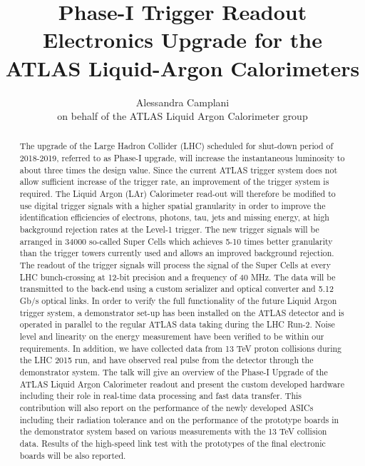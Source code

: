 \documentclass{llncs}
\title{Phase-I Trigger Readout Electronics Upgrade for the ATLAS Liquid-Argon Calorimeters}
\author{Alessandra Camplani\inst{1}\inst{2} \\ 
on behalf of the ATLAS Liquid Argon Calorimeter group}
\institute{Universt\'a degli Studi di Milano
\and INFN Milano \\
\email{alessandra.camplani@mi.infn.it}}
\begin{document}
\maketitle

\begin{abstract}
The upgrade of the Large Hadron Collider (LHC) scheduled for shut-down period of 2018-2019, referred to as Phase-I upgrade, will increase the instantaneous luminosity to about three times the design value. Since the current ATLAS trigger system does not allow sufficient increase of the trigger rate, an improvement of the trigger system is required. The Liquid Argon (LAr) Calorimeter read-out will therefore be modified to use digital trigger signals with a higher spatial granularity in order to improve the identification efficiencies of electrons, photons, tau, jets and missing energy, at high background rejection rates at the Level-1 trigger. The new trigger signals will be arranged in 34000 so-called Super Cells which achieves 5-10 times better granularity than the trigger towers currently used and allows an improved background rejection. The readout of the trigger signals will process the signal of the Super Cells at every LHC bunch-crossing at 12-bit precision and a frequency of 40 MHz. The data will be transmitted to the back-end using a custom serializer and optical converter and 5.12 Gb/s optical links. In order to verify the full functionality of the future Liquid Argon trigger system, a demonstrator set-up has been installed on the ATLAS detector and is operated in parallel to the regular ATLAS data taking during the LHC Run-2. Noise level and linearity on the energy measurement have been verified to be within our requirements. In addition, we have collected data from 13 TeV proton collisions during the LHC 2015 run, and have observed real pulse from the detector through the demonstrator system. The talk will give an overview of the Phase-I Upgrade of the ATLAS Liquid Argon Calorimeter readout and present the custom developed hardware including their role in real-time data processing and fast data transfer. This contribution will also report on the performance of the newly developed ASICs including their radiation tolerance and on the performance of the prototype boards in the demonstrator system based on various measurements with the 13 TeV collision data. Results of the high-speed link test with the prototypes of the final electronic boards will be also reported.
\end{abstract}

\end{document}
